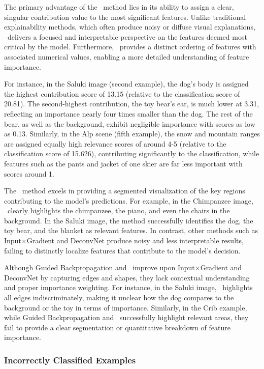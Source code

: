 The primary advantage of the \CTC\ method lies in its ability to assign a clear, singular contribution value to the most significant features. Unlike traditional explainability methods, which often produce noisy or diffuse visual explanations, \CTC\ delivers a focused and interpretable perspective on the features deemed most critical by the model. Furthermore, \CTC\ provides a distinct ordering of features with associated numerical values, enabling a more detailed understanding of feature importance.

For instance, in the Saluki image (second example), the dog's body is assigned the highest contribution score of 13.15 (relative to the classification score of 20.81). The second-highest contribution, the toy bear’s ear, is much lower at 3.31, reflecting an importance nearly four times smaller than the dog. The rest of the bear, as well as the background, exhibit negligible importance with scores as low as 0.13. Similarly, in the Alp scene (fifth example), the snow and mountain ranges are assigned equally high relevance scores of around 4-5 (relative to the classification score of 15.626), contributing significantly to the classification, while features such as the pants and jacket of one skier are far less important with scores around 1.

The \CTC\ method excels in providing a segmented visualization of the key regions contributing to the model's predictions. For example, in the Chimpanzee image, \CTC\ clearly highlights the chimpanzee, the piano, and even the chairs in the background. In the Saluki image, the method successfully identifies the dog, the toy bear, and the blanket as relevant features. In contrast, other methods such as Input$\times$Gradient and DeconvNet produce noisy and less interpretable results, failing to distinctly localize features that contribute to the model's decision.

Although Guided Backpropagation and \LRP\ improve upon Input$\times$Gradient and DeconvNet by capturing edges and shapes, they lack contextual understanding and proper importance weighting. For instance, in the Saluki image, \LRP\ highlights all edges indiscriminately, making it unclear how the dog compares to the background or the toy in terms of importance. Similarly, in the Crib example, while Guided Backpropagation and \LRP\ successfully highlight relevant areas, they fail to provide a clear segmentation or quantitative breakdown of feature importance.

\subsubsection{Incorrectly Classified Examples}

